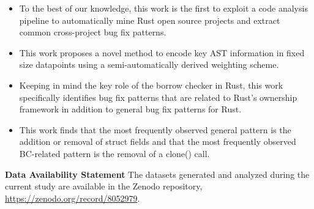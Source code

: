 \begin{itemize}
    \item To the best of our knowledge, this work is the first to exploit a code analysis pipeline to automatically mine Rust open source projects and extract common cross-project bug fix patterns.
    \item This work proposes a novel method to encode key AST information in fixed size datapoints using a semi-automatically derived weighting scheme.
    \item Keeping in mind the key role of the borrow checker in Rust, this work specifically identifies bug fix patterns that are related to Rust's ownership framework in addition to general bug fix patterns for Rust.
    \item This work finds that the most frequently observed general pattern is the addition or removal of struct fields and that the most frequently observed BC-related pattern is the removal of a clone() call. 
\end{itemize}

\noindent \textbf{Data Availability Statement} The datasets generated and analyzed during the current study are available in the Zenodo repository, \url{https://zenodo.org/record/8052979}.
